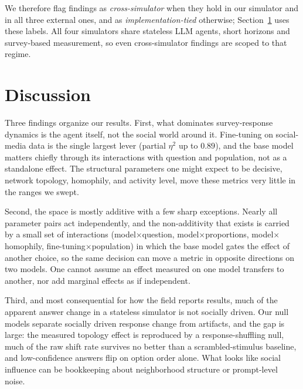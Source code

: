 \documentclass[letterpaper]{article} %
\begin{document}
We therefore flag findings as \emph{cross-simulator} when they hold in our simulator and in all three external ones, and as \emph{implementation-tied} otherwise; Section~\ref{sec:discussion} uses these labels. All four simulators share stateless LLM agents, short horizons and survey-based measurement, so even cross-simulator findings are scoped to that regime.

\section{Discussion}
\label{sec:discussion}

Three findings organize our results. First, what dominates survey-response dynamics is the agent itself, not the social world around it. Fine-tuning on social-media data is the single largest lever (partial $\eta^2$ up to $0.89$), and the base model matters chiefly through its interactions with question and population, not as a standalone effect. The structural parameters one might expect to be decisive, network topology, homophily, and activity level, move these metrics very little in the ranges we swept.

Second, the space is mostly additive with a few sharp exceptions. Nearly all parameter pairs act independently, and the non-additivity that exists is carried by a small set of interactions (model$\times$question, model$\times$proportions, model$\times$homophily, fine-tuning$\times$population) in which the base model gates the effect of another choice, so the same decision can move a metric in opposite directions on two models. One cannot assume an effect measured on one model transfers to another, nor add marginal effects as if independent.

Third, and most consequential for how the field reports results, much of the apparent answer change in a stateless simulator is not socially driven. Our null models separate socially driven response change from artifacts, and the gap is large: the measured topology effect is reproduced by a response-shuffling null, much of the raw shift rate survives no better than a scrambled-stimulus baseline, and low-confidence answers flip on option order alone. What looks like social influence can be bookkeeping about neighborhood structure or prompt-level noise.
\end{document}
